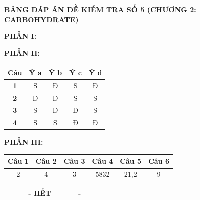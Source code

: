\documentclass[12pt,a4paper]{article}
\begin{document}
\newpage
\noindent
{\color{hfRed}\textbf{\Large BẢNG ĐÁP ÁN ĐỀ KIỂM TRA SỐ 5 (CHƯƠNG 2: CARBOHYDRATE)}}

\vspace{0.3cm}
\noindent\textbf{PHẦN I:}
\begin{center}

\end{center}

\vspace{0.2cm}
\noindent\textbf{PHẦN II:}
\begin{center}
\begin{tabular}{|c|c|c|c|c|}
\hline
\textbf{Câu} & \textbf{Ý a} & \textbf{Ý b} & \textbf{Ý c} & \textbf{Ý d} \\ \hline
\textbf{1} & S & Đ & S & Đ \\ \hline
\textbf{2} & Đ & Đ & S & S \\ \hline
\textbf{3} & S & Đ & Đ & S \\ \hline
\textbf{4} & S & S & Đ & Đ \\ \hline
\end{tabular}
\end{center}

\vspace{0.2cm}
\noindent\textbf{PHẦN III:}
\begin{center}
\begin{tabular}{|c|c|c|c|c|c|}
\hline
\textbf{Câu 1} & \textbf{Câu 2} & \textbf{Câu 3} & \textbf{Câu 4} & \textbf{Câu 5} & \textbf{Câu 6} \\ \hline
2 & 4 & 3 & 5832 & 21,2 & 9 \\ \hline
\end{tabular}
\end{center}

\par\vspace{0.1cm}
\centerline{\textbf{---------- HẾT ----------}}
\end{document}
